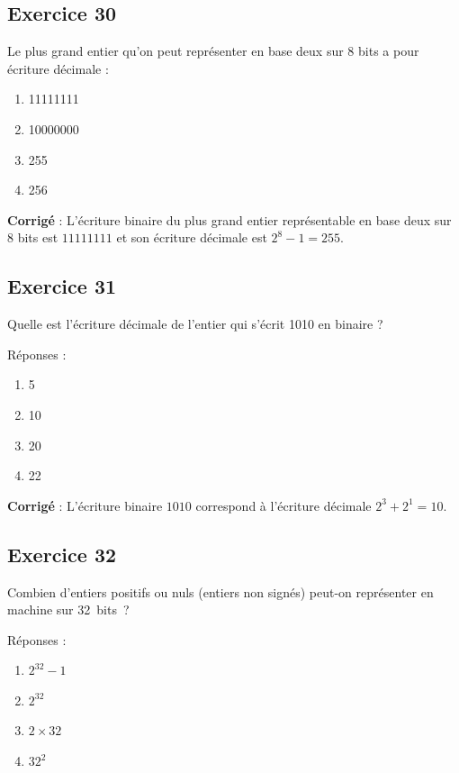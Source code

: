 \documentclass[11pt]{article}
\providecommand{\tightlist}{%
      \setlength{\itemsep}{0pt}\setlength{\parskip}{0pt}}
\begin{document}
    \hypertarget{exercice-30}{%
\subsection{Exercice 30}\label{exercice-30}}

Le plus grand entier qu'on peut représenter en base deux sur 8 bits a
pour écriture décimale :

\begin{enumerate}
\def\labelenumi{\arabic{enumi}.}
\tightlist
\item
  11111111
\item
  10000000
\item
  255
\item
  256
\end{enumerate}

    \textbf{Corrigé} : L'écriture binaire du plus grand entier représentable
en base deux sur 8 bits est \(11111111\) et son écriture décimale est
\(2^{8}-1=255\).

    \hypertarget{exercice-31}{%
\subsection{Exercice 31}\label{exercice-31}}

Quelle est l'écriture décimale de l'entier qui s'écrit 1010 en binaire ?

Réponses :

\begin{enumerate}
\def\labelenumi{\arabic{enumi}.}
\item
  5
\item
  10
\item
  20
\item
  22
\end{enumerate}

    \textbf{Corrigé} : L'écriture binaire \(1010\) correspond à l'écriture
décimale \(2^{3}+2^{1}=10\).

    \hypertarget{exercice-32}{%
\subsection{Exercice 32}\label{exercice-32}}

Combien d'entiers positifs ou nuls (entiers non signés) peut-on
représenter en machine sur 32~bits~?

Réponses :

\begin{enumerate}
\def\labelenumi{\arabic{enumi}.}
\tightlist
\item
  \(2^{32}-1\)
\item
  \(2^{32}\)
\item
  \(2 \times 32\)
\item
  \(32^{2}\)
\end{enumerate}
\end{document}

